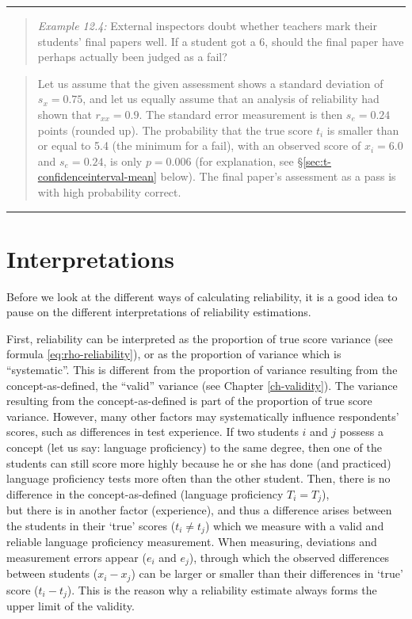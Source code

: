 \documentclass[
]{book}
\begin{document}
\begin{center}\rule{0.5\linewidth}{0.5pt}\end{center}

\begin{quote}
\emph{Example 12.4:}
External inspectors doubt whether teachers mark their students' final
papers well. If a student got a 6, should the final paper have perhaps actually
been judged as a fail?
\end{quote}

\begin{quote}
Let us assume that the given assessment shows a standard deviation
of \(s_x=0.75\), and let us equally assume that an analysis of reliability
had shown that \(r_{xx}=0.9\). The standard error measurement is then \(s_e = 0.24\)
points (rounded up). The probability that the true score \(t_i\) is smaller than
or equal to 5.4 (the minimum for a fail), with an observed
score of \(x_i=6.0\) and \(s_e=0.24\), is only \(p=0.006\) (for explanation,
see §\ref{sec:t-confidenceinterval-mean} below). The
final paper's assessment as a pass is with high probability correct.
\end{quote}

\begin{center}\rule{0.5\linewidth}{0.5pt}\end{center}

\section{Interpretations}\label{interpretations}

Before we look at the different ways of calculating
reliability, it is a good idea to pause on the different
interpretations of reliability estimations.

First, reliability can be interpreted as the proportion of
true score variance (see formula \eqref{eq:rho-reliability}), or
as the proportion of variance which is ``systematic''.
This is different from the proportion of variance resulting from the concept-as-defined,
the ``valid'' variance (see Chapter \ref{ch-validity}).
The variance resulting from the concept-as-defined is part of the proportion of
true score variance.
However, many other factors may systematically influence
respondents' scores, such as differences in test experience. If two students \(i\) and \(j\)
possess a concept (let us say: language proficiency) to the same degree, then one of the
students can still score more highly because he or she has done (and practiced) language proficiency
tests more often than the other student. Then, there is no difference
in the concept-as-defined (language proficiency \(T_i = T_j\)),\\
but there is in another factor (experience), and thus a difference arises
between the students in their `true' scores (\(t_i \neq t_j\)) which
we measure with a valid and reliable language proficiency measurement. When measuring,
deviations and measurement errors appear (\(e_i\) and \(e_j\)), through which
the observed differences between students (\(x_i-x_j\)) can be larger or smaller than their
differences in `true' score (\(t_i-t_j\)).
This is the reason why a reliability estimate always forms the upper limit of
the validity.
\end{document}
